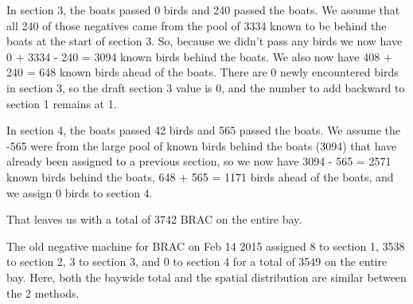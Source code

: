 \documentclass[
]{article}
\begin{document}
In section 3, the boats passed 0 birds and 240 passed the boats. We
assume that all 240 of those negatives came from the pool of 3334 known
to be behind the boats at the start of section 3. So, because we didn't
pass any birds we now have 0 + 3334 - 240 = 3094 known birds behind the
boats. We also now have 408 + 240 = 648 known birds ahead of the boats.
There are 0 newly encountered birds in section 3, so the draft section 3
value is 0, and the number to add backward to section 1 remains at 1.

In section 4, the boats passed 42 birds and 565 passed the boats. We
assume the -565 were from the large pool of known birds behind the boats
(3094) that have already been assigned to a previous section, so we now
have 3094 - 565 = 2571 known birds behind the boats, 648 + 565 = 1171
birds ahead of the boats, and we assign 0 birds to section 4.

That leaves us with a total of 3742 BRAC on the entire bay.

The old negative machine for BRAC on Feb 14 2015 assigned 8 to section
1, 3538 to section 2, 3 to section 3, and 0 to section 4 for a total of
3549 on the entire bay. Here, both the baywide total and the spatial
distribution are similar between the 2 methods.

\newpage

\providecommand{\docline}[3]{\noalign{\global\setlength{\arrayrulewidth}{#1}}\arrayrulecolor[HTML]{#2}\cline{#3}}

\setlength{\tabcolsep}{2pt}

\renewcommand*{\arraystretch}{1.5}
\end{document}
